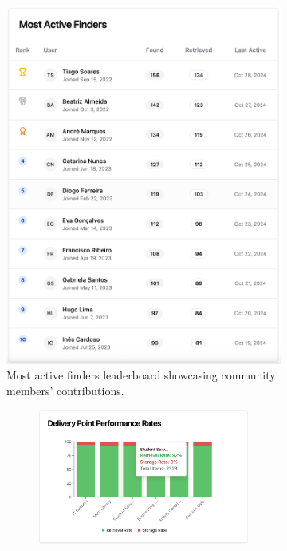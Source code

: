 \begin{figure}[h]
    \centering
    \begin{subfigure}[b]{0.49\textwidth}
        \centering
        \includegraphics[width=\textwidth]{figs/appendix/web/4A.png}
        \caption{Most active finders leaderboard showcasing community members' contributions.}
        \label{fig:web_active_finders}
    \end{subfigure}
    \hfill
    \begin{subfigure}[b]{0.49\textwidth}
        \centering
        \begin{subfigure}[b]{\textwidth}
            \centering
            \includegraphics[width=\textwidth]{figs/appendix/web/4B1.png}

\end{subfigure}
\end{subfigure}
\end{figure}
